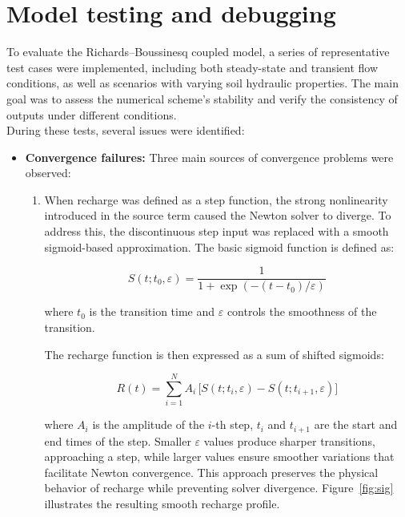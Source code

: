 \documentclass[12pt,a4paper]{article}
\begin{document}
\section{Model testing and debugging}  

To evaluate the Richards–Boussinesq coupled model, a series of representative test cases were implemented, including both steady-state and transient flow conditions, as well as scenarios with varying soil hydraulic properties. The main goal was to assess the numerical scheme’s stability and verify the consistency of outputs under different conditions.\\ 

During these tests, several issues were identified:  

\begin{itemize}  
    \item \textbf{Convergence failures:} Three main sources of convergence problems were observed:  
    \begin{enumerate}  

        \item When recharge was defined as a step function, the strong nonlinearity introduced in the source term caused the Newton solver to diverge. 
        To address this, the discontinuous step input was replaced with a smooth sigmoid-based approximation. 
        The basic sigmoid function is defined as:  
        
        \begin{equation}
        S(t; t_0, \varepsilon) = \frac{1}{1 + \exp\!\left(-(t-t_0)/\varepsilon\right)}
        \end{equation}  
        
        where $t_0$ is the transition time and $\varepsilon$ controls the smoothness of the transition.  
        
        The recharge function is then expressed as a sum of shifted sigmoids:  
        
        \begin{equation}
        R(t) = \sum_{i=1}^{N} A_i \,\big[ S(t; t_i, \varepsilon) - S(t; t_{i+1}, \varepsilon) \big]
        \end{equation}  
        
        where $A_i$ is the amplitude of the $i$-th step, $t_i$ and $t_{i+1}$ are the start and end times of the step.  
        Smaller $\varepsilon$ values produce sharper transitions, approaching a step, while larger values ensure smoother variations that facilitate Newton convergence. 
        This approach preserves the physical behavior of recharge while preventing solver divergence. 
        Figure~\ref{fig:sig} illustrates the resulting smooth recharge profile.  


\end{enumerate}
\end{itemize}
\end{document}

